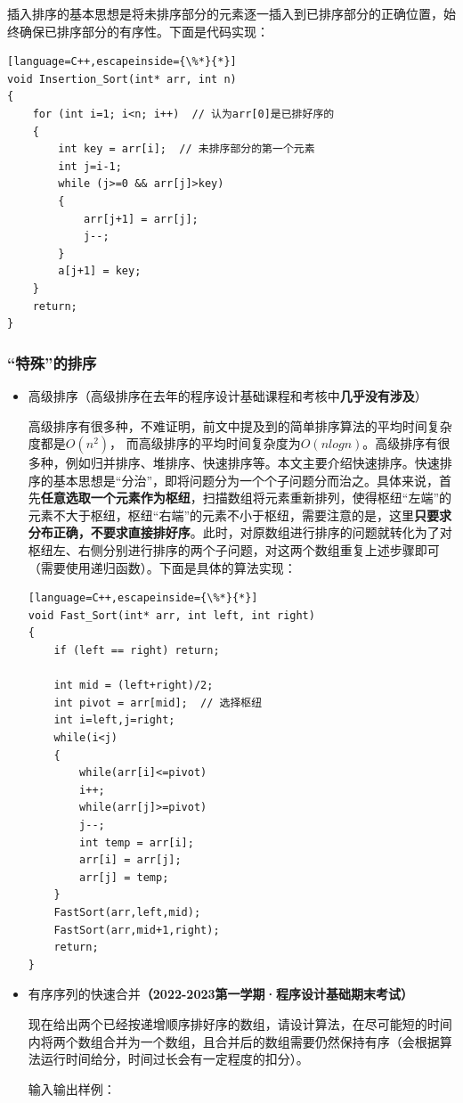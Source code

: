 \documentclass[UTF8]{ctexart}
\begin{document}
\begin{itemize}
插入排序的基本思想是将未排序部分的元素逐一插入到已排序部分的正确位置，始终确保已排序部分的有序性。下面是代码实现：
\begin{lstlisting}[language=C++,escapeinside={\%*}{*}]
void Insertion_Sort(int* arr, int n)
{
	for (int i=1; i<n; i++)  // 认为arr[0]是已排好序的 
	{
		int key = arr[i];  // 未排序部分的第一个元素
		int j=i-1;
		while (j>=0 && arr[j]>key)
		{
			arr[j+1] = arr[j];
			j--;
		}
		a[j+1] = key;
	}
	return;
}

\end{lstlisting}
\end{itemize}
\subsubsection{“特殊”的排序}
\begin{itemize}
\item 高级排序（高级排序在去年的程序设计基础课程和考核中\textbf{几乎没有涉及}）

高级排序有很多种，不难证明，前文中提及到的简单排序算法的平均时间复杂度都是$O(n^2)$，
而高级排序的平均时间复杂度为$O(nlogn)$。高级排序有很多种，例如归并排序、堆排序、快速排序等。本文主要介绍快速排序。快速排序的基本思想是“分治”，即将问题分为一个个子问题分而治之。具体来说，首先\textbf{任意选取一个元素作为枢纽}，扫描数组将元素重新排列，使得枢纽“左端”的元素不大于枢纽，枢纽“右端”的元素不小于枢纽，需要注意的是，这里\textbf{只要求分布正确，不要求直接排好序}。此时，对原数组进行排序的问题就转化为了对枢纽左、右侧分别进行排序的两个子问题，对这两个数组重复上述步骤即可（需要使用递归函数）。下面是具体的算法实现：
\begin{lstlisting}[language=C++,escapeinside={\%*}{*}]
void Fast_Sort(int* arr, int left, int right)
{
	if (left == right) return;
	
	int mid = (left+right)/2;
	int pivot = arr[mid];  // 选择枢纽
	int i=left,j=right;
	while(i<j)
	{
		while(arr[i]<=pivot)
		i++;
		while(arr[j]>=pivot)
		j--;
		int temp = arr[i];
		arr[i] = arr[j];
		arr[j] = temp;    
	}
	FastSort(arr,left,mid);
	FastSort(arr,mid+1,right);
	return;
}
\end{lstlisting}
\item 有序序列的快速合并\textbf{（2022-2023第一学期·程序设计基础期末考试）}

现在给出两个已经按递增顺序排好序的数组，请设计算法，在尽可能短的时间内将两个数组合并为一个数组，且合并后的数组需要仍然保持有序（会根据算法运行时间给分，时间过长会有一定程度的扣分）。


输入输出样例：


\end{itemize}
\end{document}
